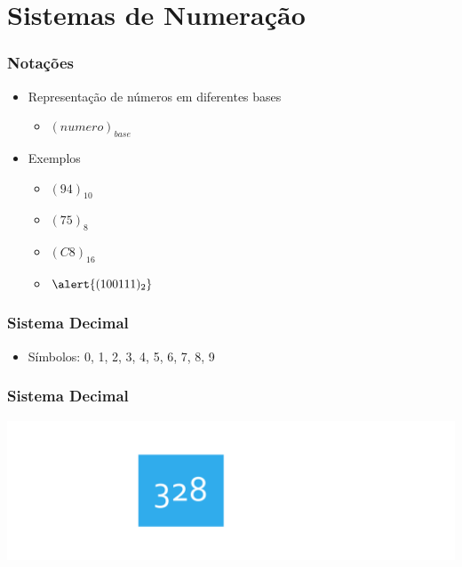 \documentclass[aspectratio=169,
				xcolor=table]{beamer}
\begin{document}
	\section{Sistemas de Numeração}	
		\begin{frame}
			\frametitle{Notações}
			\begin{itemize}
				\item Representação de números em diferentes bases
				\begin{itemize}
					\item $(numero)_{base}$
				\end{itemize}
				\vspace{1em}
				\item Exemplos
				\begin{itemize}
					\item $(94)_{10}$
					\item $(75)_{8}$
					\item $(C8)_{16}$
					\item $\alert{(100111)_{2}}$
	
				\end{itemize}
				
			\end{itemize}
		\end{frame}
		\begin{frame}
			\frametitle{Sistema Decimal}
			\begin{itemize}
				\item Símbolos: 0, 1, 2, 3, 4, 5, 6, 7, 8, 9
	
			\end{itemize}
		\end{frame}
		
		\begin{frame}
			\frametitle{Sistema Decimal}
			\includegraphics[width=\textwidth, keepaspectratio]{../figs/cap02/decimal01.png} 		
		\end{frame}
	
\end{document}
